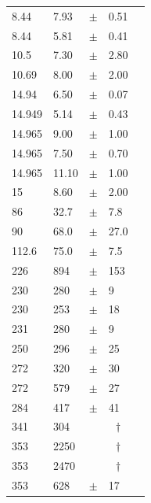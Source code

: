 \documentclass[9pt]{extarticle}   	%
\def\multic#1#2{\multicolumn{#1}{c}{#2}}
\def\dagmark{\multic{1}{$\dag$\qquad}}
\begin{document}
\begin{table}
\begin{center}
\begin{tabular}{lllll}
 8.44   &     7.93 & $\pm$ & 0.51  & \citet{1994AJ....107.1461S}\\
 8.44   &     5.81 & $\pm$ & 0.41  & \citet{1994AJ....107.1461S}\\
 10.5   &     7.30 & $\pm$ & 2.80  & \citet{1979AJ.....84.1709M}\\
 10.69  &     8.00 & $\pm$ & 2.00  & \citet{1976AA....46...11A}\\
 14.94  &     6.50 & $\pm$ & 0.07  & \citet{1986AJ.....92.1396C}\\
 14.949 &     5.14 & $\pm$ & 0.43  & \citet{1994AJ....107.1461S}\\
 14.965 &     9.00 & $\pm$ & 1.00  & \citet{1984ApJ...280L..23S}\\
 14.965 &     7.50 & $\pm$ & 0.70  & \citet{1984ApJ...282..699B}\\
 14.965 &    11.10 & $\pm$ & 1.00  & \citet{1986ApJ...303..233S}\\
 15     &     8.60 & $\pm$ & 2.00  & \citet{1982AA...107..368B}\\
 86     &     32.7 & $\pm$ & 7.8   & \citet{1986AA...164..227A}\\
 90     &     68.0 & $\pm$ & 27.0  & \citet{1977MNRAS.180..297S}\\
 112.6  &     75.0 & $\pm$ & 7.5   & \citet{1989ApJ...344..915W}\\
 226    &     894  & $\pm$ & 153   & \citet{1986AA...164..227A}\\
 230    &     280  & $\pm$ & 9     & \citet{1990AJ.....99..924B}\\
 230    &     253  & $\pm$ & 18    & \citet{1993AA...273..221R}\\
 231    &     280  & $\pm$ & 9     & \citet{2005ApJ...631.1134A}\\
 250    &     296  & $\pm$ & 25    & \citet{1994AA...281..161A}\\
 272    &     320  & $\pm$ & 30    & \citet{1990ApJ...357..606A}\\
 272    &     579  & $\pm$ & 27    & \citet{1989ApJ...340L..69W}\\
 284    &     417  & $\pm$ & 41    & \citet{1991ApJ...381..250B}\\
 341    &     304  &   & \dagmark  & \citet{2012ApJ...751..115H}\\
 353    &    2250  &   & \dagmark  & \citet{2010ApJ...710.1247S}\\
 353    &    2470  &   & \dagmark  & \citet{2008ApJS..175..277D}\\
 353    &      628 & $\pm$ & 17    & \citet{2005ApJ...631.1134A}\\

\end{tabular}
\end{center}
\end{table}
\end{document}
